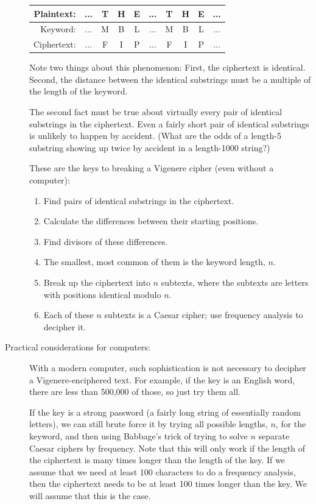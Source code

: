 \documentclass{article}
\begin{document}
\begin{description}
  \begin{tabular}{|r|c|c|c|c|c|c|c|c|c|}\hline
Plaintext: &    ... & T & H & E & ... & T & H & E & ...\\\hline
Keyword: &      ... & M & B & L & ... & M & B & L & ...\\\hline
Ciphertext: &   ... & F & I & P & ... & F & I & P & ...\\\hline
\end{tabular}


Note two things about this phenomenon: First, the ciphertext is
identical.  Second, the distance between the identical substrings must
be a multiple of the length of the keyword.

The second fact must be 
true about virtually every pair of identical substrings in the
ciphertext.  Even a fairly short pair of identical substrings is
unlikely to happen by accident. (What are the odds of a length-5
substring showing up twice by accident in a length-1000 string?)

These are the keys to breaking a Vigenere cipher (even without a
computer):
\begin{enumerate}
\item Find pairs of identical substrings in the ciphertext.
\item Calculate the differences between their starting positions.
\item Find divisors of these differences.
\item The smallest, most common of them is the keyword length, $n$.
\item Break up the ciphertext into $n$ subtexts, where the subtexts
  are letters with positions identical modulo $n$.
\item Each of these $n$ subtexts is a Caesar cipher; use frequency
  analysis to decipher it.
\end{enumerate}

\item[Practical considerations for computers:] With a modern computer,
  such sophistication is not necessary to decipher a
  Vigenere-enciphered text.  For example, if the key is an English
  word, there are less than 500,000 of those, so just try them all.

  If the key is a strong password (a fairly long string of essentially
  random letters), we can still brute force it by trying all possible
  lengths, $n$, for the keyword, and then using Babbage's trick of
  trying to solve $n$ separate Caesar ciphers by frequency.  Note that
  this will only work if the length of the ciphertext is many times
  longer than the length of the key.  If we assume that we need at
  least 100 characters to do a frequency analysis, then the ciphertext
  needs to be at least 100 times longer than the key.  We will assume
  that this is the case.


\end{description}
\end{document}
